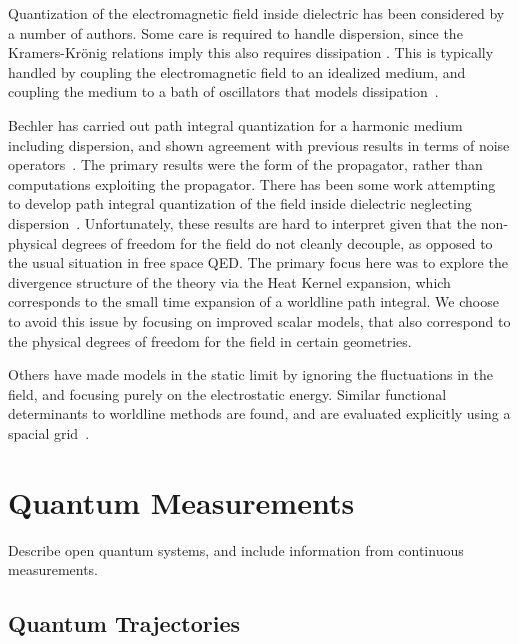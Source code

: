 Quantization of the electromagnetic field inside dielectric has been considered
 by a number of authors.  
Some care is required to handle dispersion, since the Kramers-Kr\"onig relations
 imply this also requires dissipation .  
This is typically handled by coupling the electromagnetic field to an idealized
 medium, and coupling the medium to a bath of oscillators that models
 dissipation~\cite{Huttner1992,Dung1998}.  

Bechler has carried out path integral quantization for a harmonic medium 
including dispersion, and shown agreement with previous results in terms 
of noise operators~\cite{Bechler1999}.  
The primary results were the form of the propagator, 
rather than computations exploiting the propagator.
  There has been some work attempting to develop path integral quantization of
 the field inside dielectric neglecting dispersion~\cite{Bordag1998}.
  Unfortunately, these results are hard to interpret given that the non-physical
 degrees of freedom for the field do not cleanly decouple, as opposed to the 
usual situation in free space QED.
  The primary focus here was to explore the divergence structure of the theory
 via the Heat Kernel expansion, which corresponds to the small time expansion
 of a worldline path integral.
  We choose to avoid this issue by focusing on improved scalar models, 
that also correspond to the physical degrees of freedom for the field in certain geometries.  

Others have made models in the static limit by ignoring the fluctuations in the field,
 and focusing purely on the electrostatic energy.
  Similar functional determinants to worldline methods are found,
 and are evaluated explicitly using a spacial grid~\cite{Pasquali2008}.  


\section{Quantum Measurements}

Describe open quantum systems, and include information from continuous measurements. 

\subsection{Quantum Trajectories}

